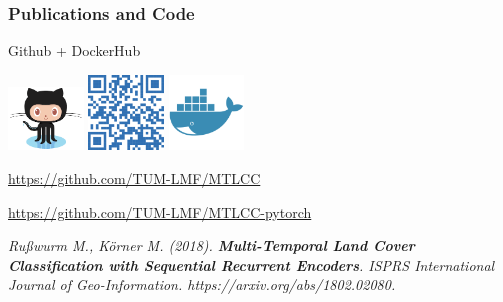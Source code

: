 \documentclass[%
  aspectratio=169,
  9pt,
ngerman,
  light,
  mathserif,
  professionalfont,
  affiliationintitlepagehead,
  titlegraphic,
   affiliation,
   navigationbar,
  progressbar,
]{beamer}
\begin{document}
\begin{frame}[c]
\frametitle{Publications and Code}
\centering 

\Large



Github + DockerHub

\vspace{1ex}

\includegraphics[width=2cm]{images/github} \hspace{.5ex}
\includegraphics[width=2cm]{images/qr_github} \hspace{.5ex}
\includegraphics[width=2cm]{images/docker}

\vspace{1ex}

\url{https://github.com/TUM-LMF/MTLCC}

\url{https://github.com/TUM-LMF/MTLCC-pytorch}

\vspace{1em}
\small
\textsl{
	Rußwurm M., Körner M. (2018). \textbf{Multi-Temporal Land Cover Classification with Sequential Recurrent Encoders}. ISPRS International Journal of Geo-Information. https://arxiv.org/abs/1802.02080.
}
	
\end{frame}
\end{document}
